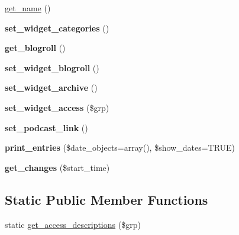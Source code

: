 \begin{DoxyCompactItemize}
\item 
\hyperlink{classlms__weblog_a4ac9deb216fc0178458a9a8dd3b7ec91}{get\_\-name} ()
\item 
\hypertarget{classlms__weblog_adb57b9d3991d6e509ab6c2a2ac6755ef}{
{\bfseries set\_\-widget\_\-categories} ()}
\label{classlms__weblog_adb57b9d3991d6e509ab6c2a2ac6755ef}

\item 
\hypertarget{classlms__weblog_aec81fdb77e91eb48406266aa15408394}{
{\bfseries get\_\-blogroll} ()}
\label{classlms__weblog_aec81fdb77e91eb48406266aa15408394}

\item 
\hypertarget{classlms__weblog_a8fe7f47f6873319ba9969e9e97859b12}{
{\bfseries set\_\-widget\_\-blogroll} ()}
\label{classlms__weblog_a8fe7f47f6873319ba9969e9e97859b12}

\item 
\hypertarget{classlms__weblog_a131d7367f9ebb6bb81ab8f0fc54ac80b}{
{\bfseries set\_\-widget\_\-archive} ()}
\label{classlms__weblog_a131d7367f9ebb6bb81ab8f0fc54ac80b}

\item 
\hypertarget{classlms__weblog_af937a428c26c5c10479e461c2cdf308e}{
{\bfseries set\_\-widget\_\-access} (\$grp)}
\label{classlms__weblog_af937a428c26c5c10479e461c2cdf308e}

\item 
\hypertarget{classlms__weblog_afed862f37a9f6c53291aec4e1731f834}{
{\bfseries set\_\-podcast\_\-link} ()}
\label{classlms__weblog_afed862f37a9f6c53291aec4e1731f834}

\item 
\hypertarget{classlms__weblog_ab3ced1177ced1e85d9cc656a445de1f9}{
{\bfseries print\_\-entries} (\$date\_\-objects=array(), \$show\_\-dates=TRUE)}
\label{classlms__weblog_ab3ced1177ced1e85d9cc656a445de1f9}

\item 
\hypertarget{classlms__weblog_a80d31865d6659d65b859d93305cdf43a}{
{\bfseries get\_\-changes} (\$start\_\-time)}
\label{classlms__weblog_a80d31865d6659d65b859d93305cdf43a}

\end{DoxyCompactItemize}
\subsection*{Static Public Member Functions}
\begin{DoxyCompactItemize}
\item 
static \hyperlink{classlms__weblog_a38d088c745ade0c1a5d2107fa06f0100}{get\_\-access\_\-descriptions} (\$grp)
\end{DoxyCompactItemize}


